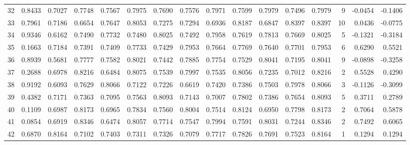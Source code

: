 \begin{tabular}{lrrrrrrrrrrrrrrr}
32  &      0.8433 &  0.7027 &  0.7748 &  0.7567 &  0.7975 &  0.7690 &  0.7576 &  0.7971 &  0.7599 &  0.7979 &   0.7496 &     0.7979 &      9 &                   -0.0454 &                    -0.1406 \\
33  &      0.7961 &  0.7186 &  0.6654 &  0.7647 &  0.8053 &  0.7275 &  0.7294 &  0.6936 &  0.8187 &  0.6847 &   0.8397 &     0.8397 &     10 &                    0.0436 &                    -0.0775 \\
34  &      0.9346 &  0.6162 &  0.7490 &  0.7732 &  0.7480 &  0.8025 &  0.7492 &  0.7958 &  0.7619 &  0.7813 &   0.7669 &     0.8025 &      5 &                   -0.1321 &                    -0.3184 \\
35  &      0.1663 &  0.7184 &  0.7391 &  0.7409 &  0.7733 &  0.7429 &  0.7953 &  0.7664 &  0.7769 &  0.7640 &   0.7701 &     0.7953 &      6 &                    0.6290 &                     0.5521 \\
36  &      0.8939 &  0.5681 &  0.7777 &  0.7582 &  0.8021 &  0.7442 &  0.7885 &  0.7754 &  0.7529 &  0.8041 &   0.7195 &     0.8041 &      9 &                   -0.0898 &                    -0.3258 \\
37  &      0.2688 &  0.6978 &  0.8216 &  0.6484 &  0.8075 &  0.7539 &  0.7997 &  0.7535 &  0.8056 &  0.7235 &   0.7012 &     0.8216 &      2 &                    0.5528 &                     0.4290 \\
38  &      0.9192 &  0.6093 &  0.7629 &  0.8066 &  0.7122 &  0.7226 &  0.6619 &  0.7420 &  0.7386 &  0.7503 &   0.7978 &     0.8066 &      3 &                   -0.1126 &                    -0.3099 \\
39  &      0.4382 &  0.7171 &  0.7363 &  0.7095 &  0.7563 &  0.8093 &  0.7143 &  0.7007 &  0.7802 &  0.7386 &   0.7654 &     0.8093 &      5 &                    0.3711 &                     0.2789 \\
40  &      0.1109 &  0.6987 &  0.8173 &  0.6965 &  0.7834 &  0.7560 &  0.8004 &  0.7514 &  0.8124 &  0.6950 &   0.7798 &     0.8173 &      2 &                    0.7064 &                     0.5878 \\
41  &      0.0854 &  0.6919 &  0.8346 &  0.6474 &  0.8057 &  0.7714 &  0.7547 &  0.7994 &  0.7591 &  0.8031 &   0.7244 &     0.8346 &      2 &                    0.7492 &                     0.6065 \\
42  &      0.6870 &  0.8164 &  0.7102 &  0.7403 &  0.7311 &  0.7326 &  0.7079 &  0.7717 &  0.7826 &  0.7691 &   0.7523 &     0.8164 &      1 &                    0.1294 &                     0.1294 \\

\end{tabular}
